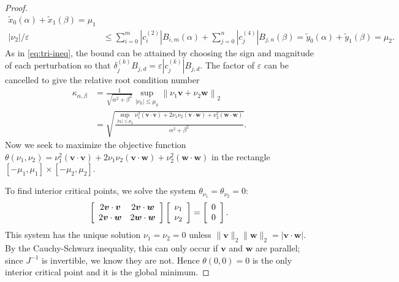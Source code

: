 \documentclass[3p, authoryear, square]{elsarticle}
\theoremstyle{definition}
\newcommand{\eps}{\varepsilon}
\begin{document}
\begin{proof}
\begin{align}
  \widetilde{x}_0(\alpha) + \widetilde{x}_1(\beta) = \mu_1 \\
\left|\nu_2\right| / \eps &\leq \sum_{i = 0}^m
  \left|c_{i}^{(2)}\right| B_{i, m}\left(\alpha\right) + \sum_{j = 0}^n
  \left|c_{j}^{(4)}\right| B_{j, n}\left(\beta\right) =
  \widetilde{y}_0(\alpha) + \widetilde{y}_1(\beta) = \mu_2.
\end{align}
As in \eqref{eq:tri-ineq}, the bound can be attained by choosing the
sign and magnitude of each perturbation so that
\(\delta_j^{(k)} B_{j, d} = \eps \left|c_j^{(k)}\right| B_{j, d}\).
The factor of \(\eps\) can be cancelled to give the relative root
condition number
\begin{align}
\kappa_{\alpha, \beta} &= \frac{1}{\sqrt{\alpha^2 + \beta^2}}
  \sup_{\left|\nu_k\right| \leq \mu_k} \left \lVert \nu_1 \bm{v} +
  \nu_2 \bm{w} \right \rVert_2 \\
  &=
  \sqrt{\frac{\sup_{\left|\nu_k\right| \leq \mu_k}
  \nu_1^2 \left(\bm{v} \cdot \bm{v}\right) +
  2 \nu_1 \nu_2 \left(\bm{v} \cdot \bm{w}\right) +
  \nu_2^2 \left(\bm{w} \cdot \bm{w}\right)}{\alpha^2 + \beta^2}}
  \label{eq:intersect-cond-num}.
\end{align}
Now we seek to maximize the objective function \(\theta(\nu_1, \nu_2) =
\nu_1^2 \left(\bm{v} \cdot \bm{v}\right) +
2 \nu_1 \nu_2 \left(\bm{v} \cdot \bm{w}\right) +
\nu_2^2 \left(\bm{w} \cdot \bm{w}\right)\) in the rectangle
\(\left[-\mu_1, \mu_1\right] \times \left[-\mu_2, \mu_2\right]\).

To find interior critical points, we solve the system \(\theta_{\nu_1} =
\theta_{\nu_2} = 0\):
\begin{equation}
\left[ \begin{array}{c c}
  2 \bm{v} \cdot \bm{v} & 2 \bm{v} \cdot \bm{w} \\
  2 \bm{v} \cdot \bm{w} & 2 \bm{w} \cdot \bm{w} \end{array}\right]
\left[ \begin{array}{c} \nu_1 \\ \nu_2 \end{array}\right] =
\left[ \begin{array}{c} 0 \\ 0 \end{array}\right].
\end{equation}
This system has the unique solution \(\nu_1 = \nu_2 = 0\) unless
\(\|\bm{v}\|_2 \|\bm{w}\|_2 = \left|\bm{v} \cdot \bm{w}\right|\).
By the Cauchy-Schwarz inequality, this can only occur if \(\bm{v}\) and
\(\bm{w}\) are parallel; since \(J^{-1}\) is invertible, we know they
are not. Hence \(\theta(0, 0) = 0\) is the only interior critical point and
it is the global minimum.


\end{proof}
\end{document}
